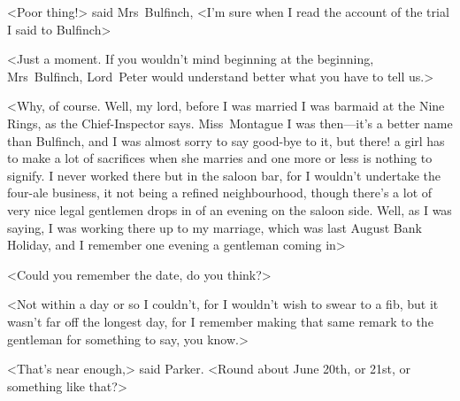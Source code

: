 <Poor thing!> said Mrs~Bulfinch, <I'm sure when I read the account of the trial I said to Bulfinch\longdash>

<Just a moment. If you wouldn't mind beginning at the beginning, Mrs~Bulfinch, Lord~Peter would understand better what you have to tell us.>

<Why, of course. Well, my lord, before I was married I was barmaid at the Nine Rings, as the Chief-Inspector says. Miss~Montague I was then—it's a better name than Bulfinch, and I was almost sorry to say good-bye to it, but there! a girl has to make a lot of sacrifices when she marries and one more or less is nothing to signify. I never worked there but in the saloon bar, for I wouldn't undertake the four-ale business, it not being a refined neighbourhood, though there's a lot of very nice legal gentlemen drops in of an evening on the saloon side. Well, as I was saying, I was working there up to my marriage, which was last August Bank Holiday, and I remember one evening a gentleman coming in\longdash>

<Could you remember the date, do you think?>

<Not within a day or so I couldn't, for I wouldn't wish to swear to a fib, but it wasn't far off the longest day, for I remember making that same remark to the gentleman for something to say, you know.>

<That's near enough,> said Parker. <Round about June 20th, or 21st, or something like that?>

